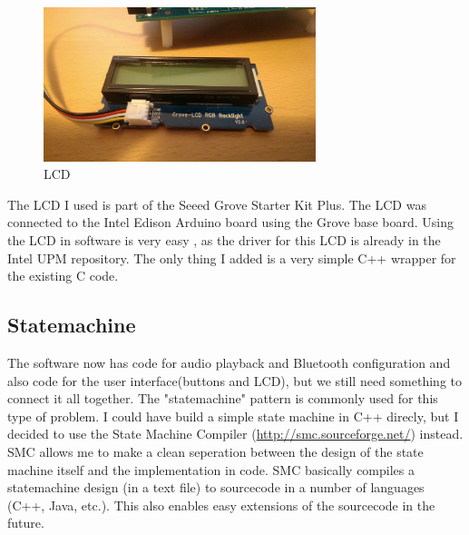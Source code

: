 \documentclass[12pt,a4paper]{scrreprt}
\begin{document}
\begin{figure}[h]
	\includegraphics[width=300px]{images/LCD}
	\caption{LCD}
\end{figure}

The LCD I used is part of the Seeed Grove Starter Kit Plus. The LCD was connected to the Intel Edison Arduino board using the Grove base board.
Using the LCD in software is very easy , as the driver for this LCD is already in the Intel UPM repository.
The only thing I added is a very simple C++ wrapper for the existing C code.

\subsection{Statemachine}
The software now has code for audio playback and Bluetooth configuration and also code for the user interface(buttons and LCD), but we still need something to connect it all together.
The "statemachine" pattern is commonly used for this type of problem. I could have build a simple state machine in C++ direcly, but I decided to use the State Machine Compiler (\url{http://smc.sourceforge.net/}) instead. SMC allows me to make a clean seperation between the design of the state machine itself and the implementation in code. 
SMC basically compiles a statemachine design (in a  text file) to sourcecode in a number of languages (C++, Java, etc.). 
This also enables easy extensions of the sourcecode in the future.
\end{document}
